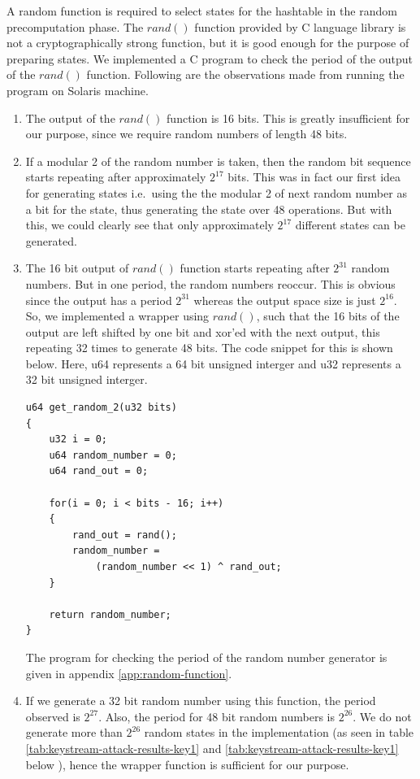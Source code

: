 A random function is required to select states for the hashtable in the random precomputation phase. The $rand()$ function provided by C language library is not a cryptographically strong function, but it is good enough for the purpose of preparing states. We implemented a C program to check the period of the output of the $rand()$ function. Following are the observations made from running the program on Solaris machine.

\begin{enumerate}
\item The output of the $rand()$ function is 16 bits. This is greatly insufficient for our purpose, since we require random numbers of length 48 bits.
\item If a modular 2 of the random number is taken, then the random bit sequence starts repeating after approximately $2^{17}$ bits. This was in fact our first idea for generating states i.e.~using the the modular 2 of next random number as a bit for the state, thus generating the state over 48 operations. But with this, we could clearly see that only approximately $2^{17}$ different states can be generated.
\item The 16 bit output of $rand()$ function starts repeating after $2^{31}$ random numbers. But in one period, the random numbers reoccur. This is obvious since the output has a period $2^{31}$ whereas the output space size is just $2^{16}$. So, we implemented a wrapper using $rand()$, such that the 16 bits of the output are left shifted by one bit and xor'ed with the next output, this repeating 32 times to generate 48 bits. The code snippet for this is shown below. Here, u64 represents a 64 bit unsigned interger and u32 represents a 32 bit unsigned interger.
\begin{lstlisting}[frame=tb]
u64 get_random_2(u32 bits)
{
	u32 i = 0;
	u64 random_number = 0;
	u64 rand_out = 0;

	for(i = 0; i < bits - 16; i++)
	{
		rand_out = rand();
		random_number = 
			(random_number << 1) ^ rand_out;
	}

	return random_number;
}
\end{lstlisting}
The program for checking the period of the random number generator is given in appendix \ref{app:random-function}.
\item If we generate a 32 bit random number using this function, the period observed is $2^{27}$. Also, the period for 48 bit random numbers is $2^{26}$. We do not generate more than $2^{26}$ random states in the implementation (as seen in table \ref{tab:keystream-attack-results-key1} and \ref{tab:keystream-attack-results-key1} below ), hence the wrapper function is sufficient for our purpose.
\end{enumerate}


